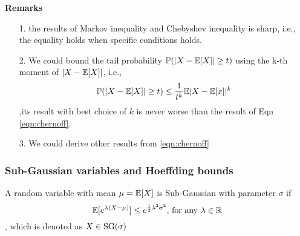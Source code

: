 
\noindent \textbf{Remarks} 
\begin{itemize}
\item[1.] the results of Markov inequality and Chebyshev inequality is sharp, i.e., the equality holds when specific conditions holds.  \\
\item[2.] We could bound the tail probability ${\mathbb{P}}(|X-{\mathbb{E}}[X]|\ge t)$ using the k-th moment of $|X-{\mathbb{E}}[X]|$, i.e., 
\begin{equation*}
{\mathbb{P}}(|X-{\mathbb{E}}[X]|\ge t) \le \frac{1}{t^k} {\mathbb{E}} |X-{\mathbb{E}}[x]|^k
\end{equation*},its result with best choice of $k$ is never worse than the result of Eqn \ref{eqn:chernoff}. 
\item[3.] We could derive other results from \ref{eqn:chernoff} 
\end{itemize}

\subsubsection{Sub-Gaussian variables and Hoeffding bounds}

\begin{definition}
A random variable with mean $\mu={\mathbb{E}}[X]$ is Sub-Gaussian with parameter $\sigma$ if 
\begin{equation}
    {\mathbb{E}}[e^{\lambda(X-\mu)}]\le e^{\frac{1}{2}\lambda^2\sigma^2}\text{, for any }\lambda\in {\mathbb{R}}
\end{equation}, which is denoted as $X\in {\mathrm{SG}}{(\sigma)}$
\end{definition}

